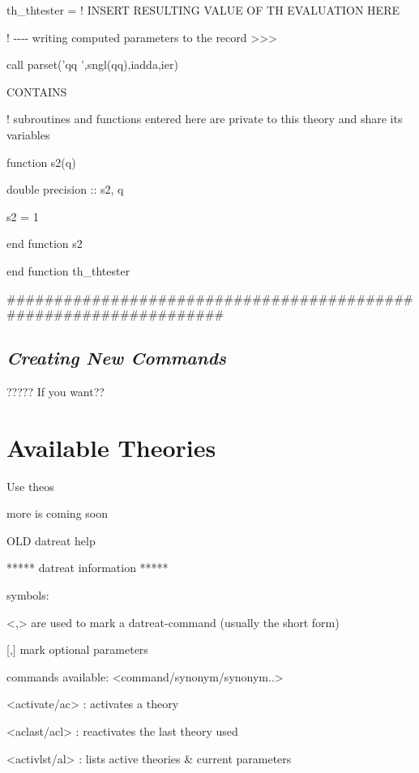 \documentclass[]{article}
\begin{document}
th\_thtester = ! INSERT RESULTING VALUE OF TH EVALUATION HERE

! -\/-\/-\/- writing computed parameters to the record
\textgreater{}\textgreater{}\textgreater{}

call parset('qq ',sngl(qq),iadda,ier)

CONTAINS

! subroutines and functions entered here are private to this theory and
share its variables

function s2(q)

double precision :: s2, q

s2 = 1

end function s2

end function th\_thtester

\#\#\#\#\#\#\#\#\#\#\#\#\#\#\#\#\#\#\#\#\#\#\#\#\#\#\#\#\#\#\#\#\#\#\#\#\#\#\#\#\#\#\#\#\#\#\#\#\#\#\#\#\#\#\#\#\#\#\#\#\#\#\#\#\#\#

\hypertarget{creating-new-commands}{%
\subsection{\texorpdfstring{\emph{Creating New
Commands}}{Creating New Commands}}\label{creating-new-commands}}

????? If you want??

\hypertarget{available-theories}{%
\section{Available Theories}\label{available-theories}}

Use theos

more is coming soon

OLD datreat help

***** datreat information *****

symbols:

\textless{},\textgreater{} are used to mark a datreat-command (usually
the short form)

{[},{]} mark optional parameters

commands available: \textless{}command/synonym/synonym..\textgreater{}

\textless{}activate/ac\textgreater{} : activates a theory

\textless{}aclast/acl\textgreater{} : reactivates the last theory used

\textless{}activlst/al\textgreater{} : lists active theories \& current
parameters
\end{document}
